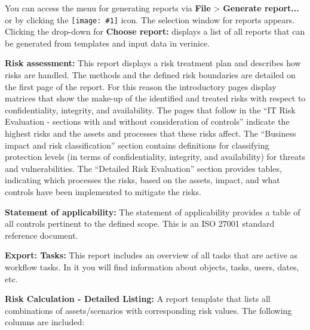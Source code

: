 \documentclass[a4paper,10pt]{book}
\newcommand{\icon}[1]{\texttt{[image: \#1]}}
\begin{document}
You can access the menu for generating reports via \textbf{File} \textgreater
\textbf{Generate report...} or by clicking the
\icon{Icon/Report.png} icon. The selection window for
reports appears. Clicking the drop-down for \textbf{Choose report:} displays a
list of all reports that can be generated from templates and input data in
verinice.

\textbf{Risk assessment:} This report displays a risk treatment plan and
describes how risks are handled. The methods and the defined risk boundaries are
detailed on the first page of the report. For this reason the introductory pages
display matrices that show the make-up of the identified and treated risks with
respect to confidentiality, integrity, and availability. The pages that follow
in the ``IT Risk Evaluation - sections with and without consideration of
controls'' indicate the highest risks and the assets and processes that these
risks affect. The ``Business impact and risk classification'' section contains
definitions for classifying protection levels (in terms of confidentiality,
integrity, and availability) for threats and vulnerabilities. The ``Detailed
Risk Evaluation'' section provides tables, indicating which processes the risks,
based on the assets, impact, and what controls have been implemented to mitigate
the risks.

\textbf{Statement of applicability:} The statement of applicability provides a
table of all controls pertinent to the defined scope. This is an ISO 27001
standard reference document.

\textbf{Export: Tasks:} This report includes an overview of all tasks that are
active as workflow tasks. In it you will find information about objects, tasks,
users, dates, etc.

\textbf{Risk Calculation - Detailed Listing:} A report template that lists all
combinations of assets/scenarios with corresponding risk values. The following
columns are included:
\end{document}
